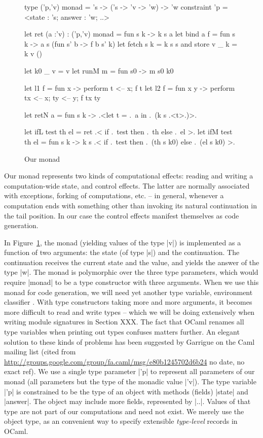 \documentclass[draft]{elsart}
\begin{document}
\begin{figure}
\begin{code}
type ('p,'v) monad = 's -> ('s -> 'v -> 'w) -> 'w
    constraint 'p = <state : 's; answer : 'w; ..>

let ret (a :'v) : ('p,'v) monad = fun s k -> k s a
let bind a f = fun s k -> a s (fun s' b -> f b s' k)
let fetch s k = k s s  and  store v _ k = k v ()

let k0 _ v = v
let runM m = fun s0 -> m s0 k0 

let l1 f = fun x     -> perform t <-- x; f t
let l2 f = fun x y   -> perform tx <-- x; ty <-- y; f tx ty

let retN a = fun s k -> .<let t = .~a in .~(k s .<t>.)>.

let ifL test th el = ret .< if .~test then .~th else .~el >.
let ifM test th el = fun s k -> 
  k s .< if .~test then .~(th s k0) else .~(el s k0) >.
\end{code}
\caption{Our monad}\label{ourmonad}
\end{figure}

Our monad represents two kinds of computational effects: reading and
writing a computation-wide state, and control effects. The latter are
normally associated with exceptions, forking of computations, etc. --
in general, whenever a computation ends with something other than
invoking its natural continuation in the tail position. In our case
the control effects manifest themselves as code generation.

In Figure~\ref{ourmonad}, the monad (yielding values of the type |v|)
is implemented as a function of two
arguments: the state (of type |s|) and the continuation. The
continuation receives the current state and the value, and
yields the answer of the type |w|.  The monad is polymorphic over the
three type parameters, which would require |monad| to be a type
constructor with three arguments. When we use this monad for code
generation, we will need yet another type variable, environment
classifier \cite{taha-environment}. With type constructors taking more
and more arguments, it becomes more difficult to read and write
types -- which we will be doing extensively when writing module
signatures in Section XXX. The fact that OCaml renames all type
variables when printing out types confuses matters further. An elegant
solution to these kinds of problems has been suggested by 
Garrigue on the Caml mailing list 
(cited from
\url{http://groups.google.com/group/fa.caml/msg/e80b1245702d6b24}
no date, no exact ref). We use a single type parameter |'p| to
represent all parameters of our monad (all parameters but the type of
the monadic value |'v|). The type variable |'p| is constrained to be
the type of an object with methods (fields) |state| and |answer|. The
object may include more fields, represented by |..|. Values of that
type are not part of our computations and need not exist. We merely
use the object type, as an convenient way to specify extensible
\emph{type-level} records in OCaml.     
\end{document}
